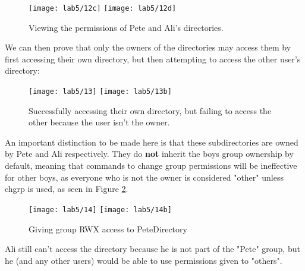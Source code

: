\begin{figure}[H]
    \centering
    \texttt{[image: lab5/12c]}
    \texttt{[image: lab5/12d]}
    \caption{Viewing the permissions of Pete and Ali's directories.}
    \label{fig:AliDirPerms}
\end{figure}

We can then prove that only the owners of the directories may access them by first accessing their
own directory, but then attempting to access the other user's directory:

\begin{figure}[H]
    \centering
    \texttt{[image: lab5/13]}
    \texttt{[image: lab5/13b]}
    \caption{Successfully accessing their own directory,
        but failing to access the other because the user isn't the owner.}
    \label{fig:PeteAliDirFail}
\end{figure}

An important distinction to be made here is that these subdirectories are owned by Pete and
Ali respectively.
They do \textbf{not} inherit the boys group ownership by default, meaning that commands to
change group permissions will be ineffective for other boys, as everyone who is not the owner
is considered "other" unless chgrp is used, as seen in Figure \ref{fig:PeteAliDirFail}.

\begin{figure}[H]
    \centering
    \texttt{[image: lab5/14]}
    \texttt{[image: lab5/14b]}
    \caption{Giving group RWX access to PeteDirectory}
    \label{fig:PeteDirFail}
\end{figure}

Ali still can't access the directory because he is not part of the "Pete" group, but he
(and any other users) would be able to use permissions given to "others".







